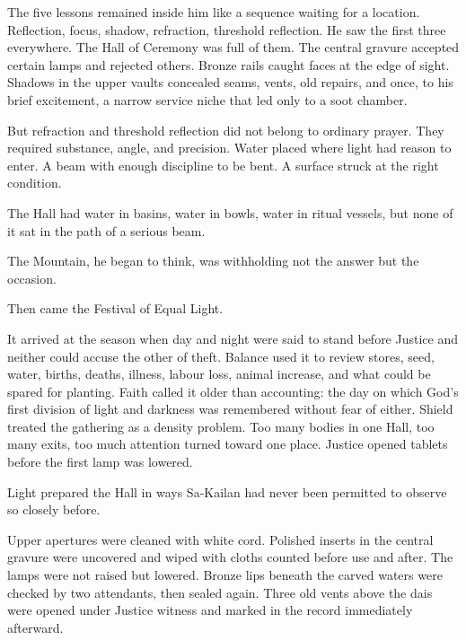 The five lessons remained inside him like a sequence waiting for a location. Reflection, focus, shadow, refraction, threshold reflection. He saw the first three everywhere. The Hall of Ceremony was full of them. The central gravure accepted certain lamps and rejected others. Bronze rails caught faces at the edge of sight. Shadows in the upper vaults concealed seams, vents, old repairs, and once, to his brief excitement, a narrow service niche that led only to a soot chamber.\par

But refraction and threshold reflection did not belong to ordinary prayer. They required substance, angle, and precision. Water placed where light had reason to enter. A beam with enough discipline to be bent. A surface struck at the right condition.\par

The Hall had water in basins, water in bowls, water in ritual vessels, but none of it sat in the path of a serious beam.\par

The Mountain, he began to think, was withholding not the answer but the occasion.\par

Then came the Festival of Equal Light.\par

It arrived at the season when day and night were said to stand before Justice and neither could accuse the other of theft. Balance used it to review stores, seed, water, births, deaths, illness, labour loss, animal increase, and what could be spared for planting. Faith called it older than accounting: the day on which God’s first division of light and darkness was remembered without fear of either. Shield treated the gathering as a density problem. Too many bodies in one Hall, too many exits, too much attention turned toward one place. Justice opened tablets before the first lamp was lowered.\par

Light prepared the Hall in ways Sa-Kailan had never been permitted to observe so closely before.\par

Upper apertures were cleaned with white cord. Polished inserts in the central gravure were uncovered and wiped with cloths counted before use and after. The lamps were not raised but lowered. Bronze lips beneath the carved waters were checked by two attendants, then sealed again. Three old vents above the dais were opened under Justice witness and marked in the record immediately afterward.\par

